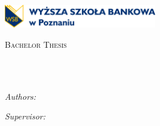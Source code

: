 \documentclass[
    11pt,
    english, %
    singlespacing, %
    headsepline, %
    oneside, %
]{MastersDoctoralThesis} %
\author{Petro Kolosov, Serhii Holishevskyi, Illia Zubachov, Arslanbek Temirbekov} %
\begin{document}
    \frontmatter %

    \pagestyle{plain} %


    \begin{titlepage}
        \begin{center}
            \includegraphics[width=0.5\textwidth]{wsb_logo} \\ %
            \vspace*{.06\textheight}
            {\scshape\LARGE \univname\par}\vspace{1.5cm} %
            \textsc{\Large Bachelor Thesis}\\[0.5cm] %

            \HRule \\[0.4cm] %
            {\huge \bfseries \ttitle\par}\vspace{0.4cm}
            \HRule \\[1.5cm] %

            \begin{minipage}[t]{0.4\textwidth}
                \begin{flushleft}
                    \large
                    \emph{Authors:}\\
                    \authorname %
                \end{flushleft}
            \end{minipage}
            \begin{minipage}[t]{0.4\textwidth}
                \begin{flushright}
                    \large
                    \emph{Supervisor:} \\
                    \supname %
                \end{flushright}
            \end{minipage}\\[3cm]


\end{center}
\end{titlepage}
\end{document}
